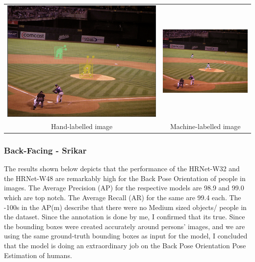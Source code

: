 \documentclass[a4paper,12pt]{article}
\begin{document}
    \begin{center}
\begin{tabular}{cc}
\includegraphics[scale=0.25]{front_label_small.png}
&
\includegraphics[scale=0.5]{front_small_pred.png}
\\
Hand-labelled image & Machine-labelled image
\end{tabular}
\end{center}

\subsubsection{Back-Facing - Srikar}

The results shown below depicts that the performance of the HRNet-W32 and the HRNet-W48 are remarkably high for the Back Pose Orientation of people in images. The Average Precision (AP) for the respective models are 98.9 and 99.0 which are top notch. The Average Recall (AR) for the same are 99.4 each. The -100s in the AP(m) describe that there were no Medium sized objects/ people in the dataset. Since the annotation is done by me, I confirmed that its true. Since the bounding boxes were created accurately around persons' images, and we are using the same ground-truth bounding boxes as input for the model, I concluded that the model is doing an extraordinary job on the Back Pose Orientation Pose Estimation of humans.
\end{document}
